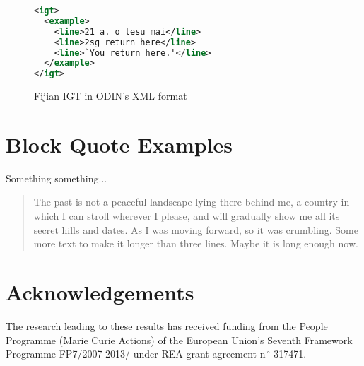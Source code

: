\documentclass[11pt]{article}
\begin{document}
\begin{figure}[!htb]
\small
\begin{lstlisting}[language=XML]
<igt>
  <example>
    <line>21 a. o lesu mai</line>
    <line>2sg return here</line>
    <line>`You return here.'</line>
  </example>
</igt>
\end{lstlisting} 
\caption{Fijian IGT in ODIN's XML format} \label{fig:odin_fijian_xml}
\end{figure}

\newpage
\section{Block Quote Examples}

Something something...

\blockquote{The past is not a peaceful landscape lying there behind me, 
a country in which I can stroll wherever I please, 
and will gradually show me all its secret hills and dates. 
As I was moving forward, so it was crumbling. 
Some more text to make it longer than three lines. 
Maybe it is long enough now.}


\newpage
\section*{Acknowledgements}

The research leading to these results has received funding from the People Programme (Marie Curie Actions) of the European Union's Seventh Framework Programme FP7/2007-2013/ under REA grant agreement n$\,^{\circ}$ 317471.
\end{document}
